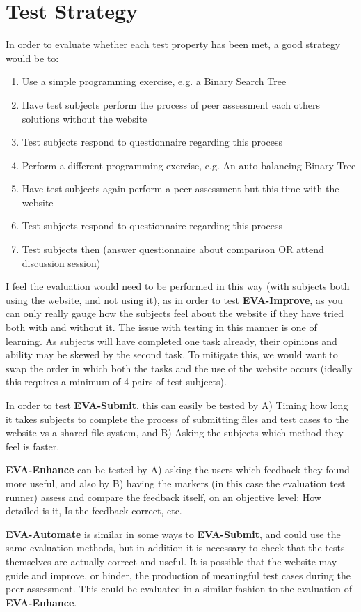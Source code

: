 \documentclass[a4paper,11pt]{report}
\begin{document}
\section{Test Strategy}
In order to evaluate whether each test property has been met, a good strategy would be to:
\begin{enumerate}
 \item Use a simple programming exercise, e.g. a Binary Search Tree
 \item Have test subjects perform the process of peer assessment each others solutions without the website
 \item Test subjects respond to questionnaire regarding this process
 \item Perform a different programming exercise, e.g. An auto-balancing Binary Tree
 \item Have test subjects again perform a peer assessment but this time with the website
 \item Test subjects respond to questionnaire regarding this process
 \item Test subjects then (answer questionnaire about comparison OR attend discussion session)
\end{enumerate}
I feel the evaluation would need to be performed in this way (with subjects both using the website, and not using it), as in order to test \textbf{EVA-Improve}, as you can only really gauge how the subjects feel about the website if they have tried both with and without it. The issue with testing in this manner is one of learning. As subjects will have completed one task already, their opinions and ability may be skewed by the second task. To mitigate this, we would want to swap the order in which both the tasks and the use of the website occurs (ideally this requires a minimum of 4 pairs of test subjects).\par
In order to test \textbf{EVA-Submit}, this can easily be tested by A) Timing how long it takes subjects to complete the process of submitting files and test cases to the website vs a shared file system, and B) Asking the subjects which method they feel is faster.\par
\textbf{EVA-Enhance} can be tested by A) asking the users which feedback they found more useful, and also by B) having the markers (in this case the evaluation test runner) assess and compare the feedback itself, on an objective level: How detailed is it, Is the feedback correct, etc.\par
\textbf{EVA-Automate} is similar in some ways to \textbf{EVA-Submit}, and could use the same evaluation methods, but in addition it is necessary to check that the tests themselves are actually correct and useful. It is possible that the website may guide and improve, or hinder, the production of meaningful test cases during the peer assessment. This could be evaluated in a similar fashion to the evaluation of \textbf{EVA-Enhance}.
\end{document}
